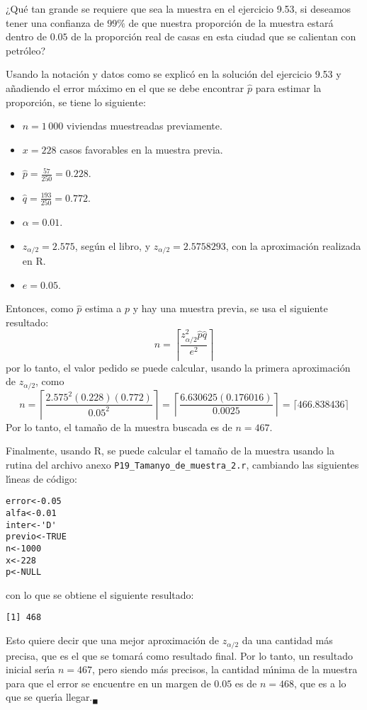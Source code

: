 \begin{enunciado}
 ¿Qu\'e tan grande se requiere que sea la muestra en el ejercicio 9.53, si deseamos tener una confianza de $99\%$ de que nuestra proporci\'on de la muestra estar\'a dentro de $0.05$ de la proporci\'on real de casas en esta ciudad que se calientan con petr\'oleo?
\end{enunciado}

\begin{solucion}
 Usando la notaci\'on y datos como se explic\'o en la soluci\'on del ejercicio 9.53 y a\~nadiendo el error m\'aximo en el que se debe encontrar $\hat{p}$ para estimar la proporci\'on, se tiene lo siguiente:
 \begin{itemize}
  \item $n = 1\,000$ viviendas muestreadas previamente.
  \item $x = 228$ casos favorables en la muestra previa.
  \item $\hat{p} = \frac{57}{250} = 0.228$.
  \item $\hat{q} = \frac{193}{250} = 0.772$.
  \item $\alpha = 0.01$.
  \item $z_{\alpha/2} = 2.575$, seg\'un el libro, y $z_{\alpha/2} = 2.5758293$, con la aproximaci\'on realizada en R.
  \item $e = 0.05$.
 \end{itemize}
 Entonces, como $\hat{p}$ estima a $p$ y hay una muestra previa, se usa el siguiente resultado:
 \begin{equation*}
  n = \left\lceil \frac{z_{\alpha/2}^2\hat{p}\hat{q}}{e^2} \right\rceil
 \end{equation*}
 por lo tanto, el valor pedido se puede calcular, usando la primera aproximaci\'on de $z_{\alpha/2}$, como
 \begin{equation*}
  n = \left\lceil \frac{2.575^2(0.228)(0.772)}{0.05^2} \right\rceil = \left\lceil \frac{6.630625(0.176016)}{0.0025} \right\rceil = \lceil 466.838436 \rceil
 \end{equation*}
 Por lo tanto, el tama\~no de la muestra buscada es de $n = 467$.
 \par 
 Finalmente, usando R, se puede calcular el tama\~no de la muestra usando la rutina del archivo anexo \texttt{P19\_Tamanyo\_de\_muestra\_2.r}, cambiando las siguientes l\'{\i}neas de c\'odigo:
 \begin{verbatim}
error<-0.05
alfa<-0.01
inter<-'D'
previo<-TRUE
n<-1000
x<-228
p<-NULL
 \end{verbatim}
 \vspace{-0.5cm}
 con lo que se obtiene el siguiente resultado:
 \begin{verbatim}
[1] 468
 \end{verbatim}
 \vspace{-0.5cm}
 Esto quiere decir que una mejor aproximaci\'on de $z_{\alpha/2}$ da una cantidad m\'as precisa, que es el que se tomar\'a como resultado final. Por lo tanto, un resultado inicial ser\'{\i}a $n=467$, pero siendo m\'as precisos, la cantidad m\'{\i}nima de la muestra para que el error se encuentre en un margen de $0.05$ es de $n = 468$, que es a lo que se quer\'{\i}a llegar.${}_{\blacksquare}$
\end{solucion}
